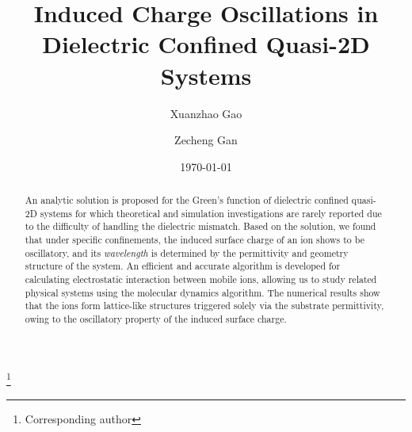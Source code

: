 \documentclass[aps,prl,reprint,showpacs,floatfix,superscriptaddress]{revtex4-2}
\begin{document}

\title{Induced Charge Oscillations in Dielectric Confined Quasi-2D Systems}

\author{Xuanzhao Gao}

\author{Zecheng Gan} \thanks{Corresponding author}

\date{\today}

\begin{abstract}
An analytic solution is proposed for the Green's function of dielectric confined quasi-2D systems for which theoretical and simulation investigations are rarely reported due to the difficulty of handling the dielectric mismatch.
Based on the solution, we found that under specific confinements, the induced surface charge of an ion shows to be oscillatory, and its \textit{wavelength} is determined by the permittivity and geometry structure of the system. 
An efficient and accurate algorithm is developed for calculating electrostatic interaction between mobile ions, allowing us to study related physical systems using the molecular dynamics algorithm.
The numerical results show that the ions form lattice-like structures triggered solely via the substrate permittivity, owing to the oscillatory property of the induced surface charge.
\end{abstract}
\end{document}
